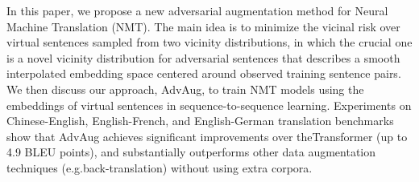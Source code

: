 In this paper, we propose a new adversarial augmentation method for Neural Machine  Translation (NMT).  The main idea is to minimize the vicinal risk over virtual sentences sampled from two vicinity distributions, in which the crucial one is a novel vicinity distribution  for adversarial sentences that describes a smooth interpolated embedding space centered  around observed training sentence pairs. We then discuss our approach, AdvAug, to train  NMT models using the embeddings of virtual sentences in sequence-to-sequence learning.   Experiments on Chinese-English, English-French, and English-German translation benchmarks show that AdvAug achieves significant improvements over theTransformer (up to 4.9 BLEU points), and substantially outperforms other data augmentation techniques (e.g.back-translation) without using extra corpora.
